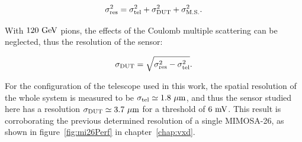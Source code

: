       \begin{equation}
        \sigma_{\rm{res}}^2 = \sigma_{\rm{tel}}^2 + \sigma_{\rm{DUT}}^2 + \sigma_{\rm{M.S.}}^2.
        \label{eq:pointingResolution}
      \end{equation}

      With $120~\rm{GeV}$ pions, the effects of the Coulomb multiple scattering can be neglected, thus the resolution of the sensor:

      \begin{equation}
        \sigma_{\rm{DUT}} = \sqrt{\sigma_{\rm{res}}^2 - \sigma_{\rm{tel}}^2}.
      \end{equation}

      For the configuration of the telescope used in this work, the spatial resolution of the whole system is measured to be $\sigma_{\rm{tel}} \simeq 1.8~\rm{\mu m}$, and thus the sensor studied here has a resolution $\sigma_{\rm{DUT}} \simeq 3.7~\rm{\mu m}$ for a threshold of $6~\rm{mV}$.
      This result is corroborating the previous determined resolution of a single MIMOSA-26, as shown in figure~\ref{fig:mi26Perf} in chapter~\ref{chap:vxd}.
      
